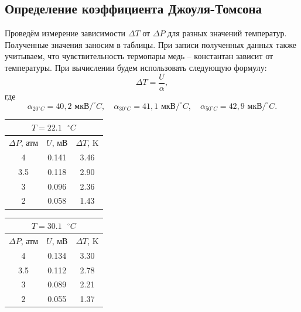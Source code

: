 \documentclass[a4paper,12pt]{article}
\theoremstyle{definition}
\begin{document}
	\subsection{Определение коэффициента Джоуля-Томсона}
	
	Проведём измерение зависимости $ \Delta T $ от $ \Delta P $ для разных значений температур. Полученные значения заносим в таблицы. При записи полученных данных также учитываем, что чувствительность термопары медь -- константан зависит от температуры. При вычислении будем использовать следующую формулу: \[ \Delta T = \frac{U}{\alpha}, \] где \[ \alpha_{20^\circ C} = 40,2 \text{ мкВ}/^\circ C, \quad \alpha_{30^\circ C} = 41,1 \text{ мкВ}/^\circ C, \quad \alpha_{50^\circ C} = 42,9 \text{ мкВ}/^\circ C . \]
	
	\begin{table}[H]
		\begin{minipage}{.49\linewidth}
			\centering
			\begin{tabular}{|c|c|c|}
				\hline
				\multicolumn{3}{|c|}{$ T = 22.1 \text{ } ^\circ C $} \\ \hline
				$ \Delta P $, атм &  $ U $, мВ &  $ \Delta T $, K  \\
				\hline
				4 & 0.141 & 3.46 \\ \hline
				3.5 & 0.118 & 2.90 \\ \hline
				3 & 0.096 & 2.36 \\ \hline
				2 & 0.058 & 1.43 \\ \hline
			\end{tabular}
		\end{minipage}
		\begin{minipage}{.49\linewidth}
			\centering
			\begin{tabular}{|c|c|c|}
				\hline
				\multicolumn{3}{|c|}{$ T = 30.1 \text{ } ^\circ C $} \\ \hline
				$ \Delta P $, атм &  $ U $, мВ &  $ \Delta T $, K  \\
				\hline
				4 & 0.134 & 3.30 \\ \hline
				3.5 & 0.112 & 2.78 \\ \hline
				3 & 0.089 & 2.21 \\ \hline
				2 & 0.055 & 1.37 \\ \hline
			\end{tabular}
		\end{minipage}
	\end{table}
\end{document}
